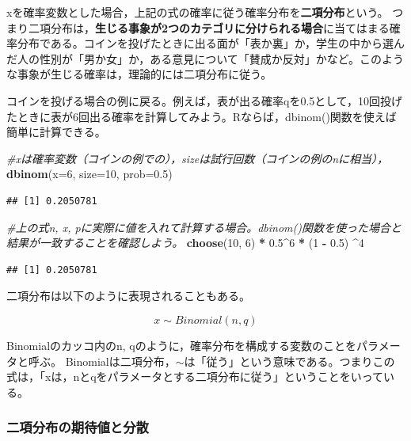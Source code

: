 \documentclass[]{article}
\newenvironment{Shaded}{\begin{snugshade}}{\end{snugshade}}
\newcommand{\KeywordTok}[1]{\textcolor[rgb]{0.13,0.29,0.53}{\textbf{#1}}}
\newcommand{\DataTypeTok}[1]{\textcolor[rgb]{0.13,0.29,0.53}{#1}}
\newcommand{\DecValTok}[1]{\textcolor[rgb]{0.00,0.00,0.81}{#1}}
\newcommand{\FloatTok}[1]{\textcolor[rgb]{0.00,0.00,0.81}{#1}}
\newcommand{\StringTok}[1]{\textcolor[rgb]{0.31,0.60,0.02}{#1}}
\newcommand{\CommentTok}[1]{\textcolor[rgb]{0.56,0.35,0.01}{\textit{#1}}}
\newcommand{\OperatorTok}[1]{\textcolor[rgb]{0.81,0.36,0.00}{\textbf{#1}}}
\newcommand{\NormalTok}[1]{#1}
\begin{document}
xを確率変数とした場合，上記の式の確率に従う確率分布を\textbf{二項分布}という。
つまり二項分布は，\textbf{生じる事象が2つのカテゴリに分けられる場合}に当てはまる確率分布である。コインを投げたときに出る面が「表か裏」か，学生の中から選んだ人の性別が「男か女」か，ある意見について「賛成か反対」かなど。このような事象が生じる確率は，理論的には二項分布に従う。

コインを投げる場合の例に戻る。例えば，表が出る確率qを0.5として，10回投げたときに表が6回出る確率を計算してみよう。Rならば，dbinom()関数を使えば簡単に計算できる。

\begin{Shaded}
\begin{Highlighting}[]
\CommentTok{#xは確率変数（コインの例での），sizeは試行回数（コインの例のnに相当），}
\KeywordTok{dbinom}\NormalTok{(}\DataTypeTok{x=}\DecValTok{6}\NormalTok{, }\DataTypeTok{size=}\DecValTok{10}\NormalTok{, }\DataTypeTok{prob=}\FloatTok{0.5}\NormalTok{)}
\end{Highlighting}
\end{Shaded}

\begin{verbatim}
## [1] 0.2050781
\end{verbatim}

\begin{Shaded}
\begin{Highlighting}[]
\CommentTok{#上の式n, x, pに実際に値を入れて計算する場合。dbinom()関数を使った場合と結果が一致することを確認しよう。}
\KeywordTok{choose}\NormalTok{(}\DecValTok{10}\NormalTok{, }\DecValTok{6}\NormalTok{) }\OperatorTok{*}\StringTok{ }\FloatTok{0.5}\OperatorTok{^}\DecValTok{6} \OperatorTok{*}\StringTok{ }\NormalTok{(}\DecValTok{1} \OperatorTok{-}\StringTok{ }\FloatTok{0.5}\NormalTok{) }\OperatorTok{^}\DecValTok{4}
\end{Highlighting}
\end{Shaded}

\begin{verbatim}
## [1] 0.2050781
\end{verbatim}

二項分布は以下のように表現されることもある。

\[
x \sim Binomial(n, q)
\]

Binomialのカッコ内のn,
qのように，確率分布を構成する変数のことをパラメータと呼ぶ。
Binomialは二項分布，\(\sim\)は「従う」という意味である。つまりこの式は，「xは，nとqをパラメータとする二項分布に従う」ということをいっている。

\subsubsection{二項分布の期待値と分散}
\end{document}
